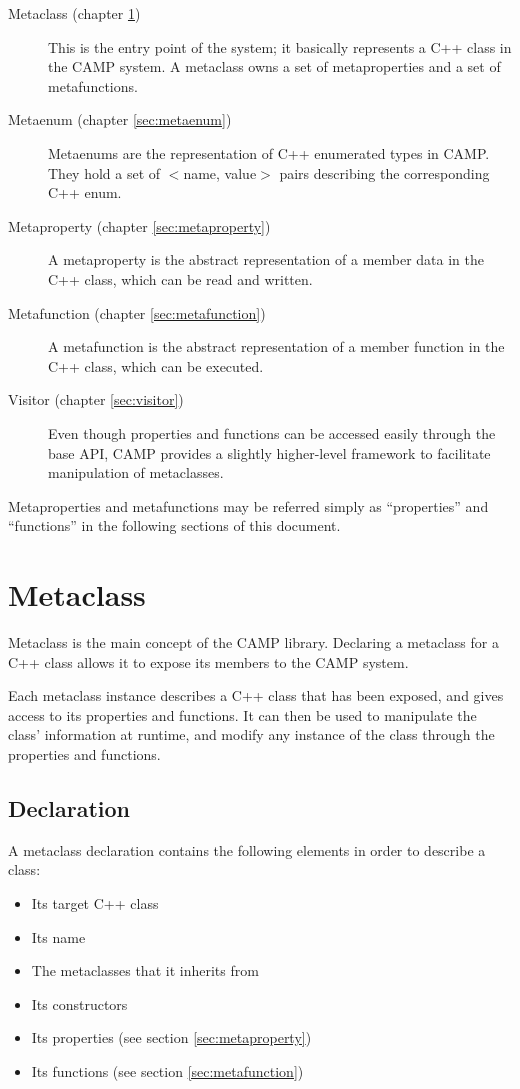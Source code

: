 \documentclass[a4paper, twoside]{report}
\begin{document}
	\begin{description}
		\item[Metaclass (chapter \ref{sec:metaclass})]
			This is the entry point of the system; it basically	represents a C++ class in the CAMP system.
			A metaclass owns a set of metaproperties and a set of metafunctions.
		\item[Metaenum (chapter \ref{sec:metaenum})]
			Metaenums are the representation of C++ enumerated types in CAMP. They hold a set of
			$<$name, value$>$ pairs describing the corresponding C++ enum.
		\item[Metaproperty (chapter \ref{sec:metaproperty})]
			A metaproperty is the abstract representation of a member data in the C++ class,
			which can be read and written.
		\item[Metafunction (chapter \ref{sec:metafunction})]
			A metafunction is the abstract representation of a member function in the C++ class,
			which can be executed.
		\item[Visitor (chapter \ref{sec:visitor})]
			Even though properties and functions can be accessed easily through the base API, CAMP provides a slightly
			higher-level framework to facilitate manipulation of metaclasses.
	\end{description}

	\ibinfo
	{
			Metaproperties and metafunctions may be referred simply as ``properties'' and ``functions'' in the following sections
			of this document.
	}

\section{Metaclass}
\label{sec:metaclass}

	Metaclass is the main concept of the CAMP library. Declaring a metaclass for a
	C++ class allows it to expose its members to the CAMP system.
	
	Each metaclass instance describes a C++ class that has been exposed, and gives
	access to its properties and functions. It can then be used	to manipulate the
	class' information at runtime, and modify any instance of the class through
	the properties and functions.

\subsection{Declaration}

	A metaclass declaration contains the following elements in order to describe a class:
	\begin{itemize}
		\item Its target C++ class
		\item Its name
		\item The metaclasses that it inherits from
		\item Its constructors
		\item Its properties (see section \ref{sec:metaproperty})
		\item Its functions (see section \ref{sec:metafunction})
	\end{itemize}
\end{document}
